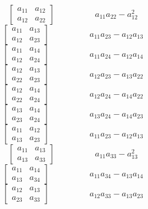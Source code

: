 \documentclass[12pt]{article}
\begin{document}
$$\left[\begin{matrix}a_{11} & a_{12}\\a_{12} & a_{22}\end{matrix}\right]\hspace{2cm} a_{11} a_{22} - a_{12}^{2}$$   
$$\left[\begin{matrix}a_{11} & a_{13}\\a_{12} & a_{23}\end{matrix}\right]\hspace{2cm} a_{11} a_{23} - a_{12} a_{13}$$   
$$\left[\begin{matrix}a_{11} & a_{14}\\a_{12} & a_{24}\end{matrix}\right]\hspace{2cm} a_{11} a_{24} - a_{12} a_{14}$$   
$$\left[\begin{matrix}a_{12} & a_{13}\\a_{22} & a_{23}\end{matrix}\right]\hspace{2cm} a_{12} a_{23} - a_{13} a_{22}$$   
$$\left[\begin{matrix}a_{12} & a_{14}\\a_{22} & a_{24}\end{matrix}\right]\hspace{2cm} a_{12} a_{24} - a_{14} a_{22}$$   
$$\left[\begin{matrix}a_{13} & a_{14}\\a_{23} & a_{24}\end{matrix}\right]\hspace{2cm} a_{13} a_{24} - a_{14} a_{23}$$   
$$\left[\begin{matrix}a_{11} & a_{12}\\a_{13} & a_{23}\end{matrix}\right]\hspace{2cm} a_{11} a_{23} - a_{12} a_{13}$$   
$$\left[\begin{matrix}a_{11} & a_{13}\\a_{13} & a_{33}\end{matrix}\right]\hspace{2cm} a_{11} a_{33} - a_{13}^{2}$$   
$$\left[\begin{matrix}a_{11} & a_{14}\\a_{13} & a_{34}\end{matrix}\right]\hspace{2cm} a_{11} a_{34} - a_{13} a_{14}$$   
$$\left[\begin{matrix}a_{12} & a_{13}\\a_{23} & a_{33}\end{matrix}\right]\hspace{2cm} a_{12} a_{33} - a_{13} a_{23}$$   
\end{document}
